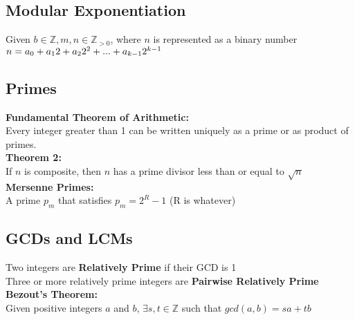 \documentclass[letter]{article}
\begin{document}
\begin{multicols}{2}
  \subsection{Modular Exponentiation} 
  Given $b \in \mathbb{Z}, m, n \in \mathbb{Z}_{>0}$, where $n$ is represented as a binary number
  $\\ n = a_0 + a_1 2 + a_2 2^2 + ... + a_{k-1}2^{k-1}$

  \subsection{Primes} 
  \textbf{Fundamental Theorem of Arithmetic:}\\
  Every integer greater than 1 can be written uniquely as a prime or as product of primes.\\
  \textbf{Theorem 2:}\\
  If $n$ is composite, then $n$ has a prime divisor less than or equal to $\sqrt n$\\
  \textbf{Mersenne Primes:}\\ A prime $p_m$ that satisfies $p_m = 2^R - 1$ (R is whatever)

  \subsection{GCDs and LCMs} 
  Two integers are \textbf{Relatively Prime} if their GCD is 1\\
  Three or more relatively prime integers are \textbf{Pairwise Relatively Prime}\\
  \textbf{Bezout's Theorem:}\\ Given positive integers $a$ and $b$, $\exists s,t\in \mathbb{Z}$
  such that $gcd(a,b) = sa + tb$


\end{multicols}
\end{document}
